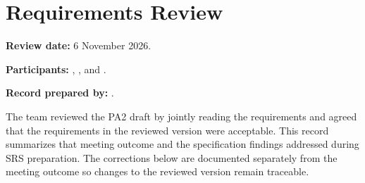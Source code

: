 \section{Requirements Review}

\textbf{Review date:} 6 November 2026.\par
\textbf{Participants:} , ,  and .\par
\textbf{Record prepared by:} .\par

The team reviewed the PA2 draft by jointly reading the requirements and agreed that the requirements in the reviewed version were acceptable. This record summarizes that meeting outcome and the specification findings addressed during SRS preparation. The corrections below are documented separately from the meeting outcome so changes to the reviewed version remain traceable.

